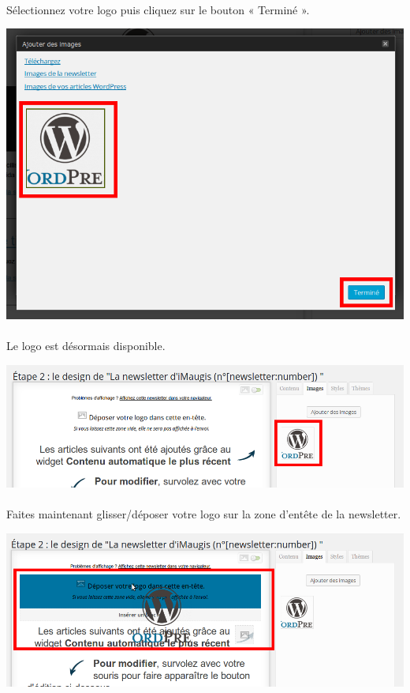 \documentclass[10pt,a4paper]{article}
\begin{document}
\paragraph{}Sélectionnez votre logo puis cliquez sur le bouton « Terminé ».
\begin{center}
\includegraphics[scale=0.3]{img/0221.png}
\end{center}
\paragraph{}Le logo est désormais disponible.
\begin{center}
\includegraphics[scale=0.3]{img/0222.png}
\end{center}
\paragraph{}Faites maintenant glisser/déposer votre logo sur la zone d'entête de la newsletter.
\begin{center}
\includegraphics[scale=0.3]{img/0223.png}
\end{center}
\end{document}
